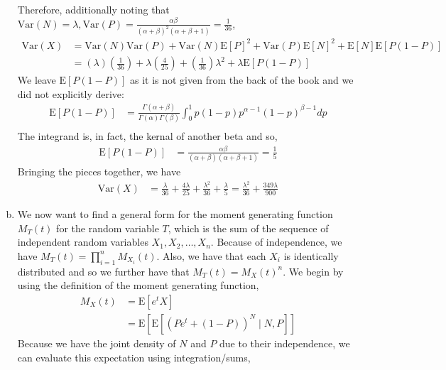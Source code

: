 \documentclass[11pt]{article}
\begin{document}
\begin{enumerate}[(a)]
Therefore, additionally noting that $\mathrm{Var}(N) = \lambda,
\mathrm{Var}(P) = \frac{\alpha
  \beta}{(\alpha+\beta)^2(\alpha+\beta+1)} = \frac{1}{36}$,
\begin{align*}
  \mathrm{Var}(X) &= \mathrm{Var}(N) \mathrm{Var}(P) +
                    \mathrm{Var}(N)\mathrm{E}[P]^2 + \mathrm{Var}(P)
                    \mathrm{E}[N]^2 + \mathrm{E}[N] \mathrm{E}[P(1-P)]
  \\
  &= (\lambda)\left(\frac{1}{36}\right) + \lambda \left( \frac{4}{25}
    \right) + \left( \frac{1}{36} \right) \lambda^2 + \lambda \mathrm{E}[P(1-P)]
\end{align*}
We leave $\mathrm{E}[P(1-P)]$ as it is not given from the back of the
book and we did not explicitly derive:
\begin{align*}
  \mathrm{E}[P(1-P)] &= \frac{\Gamma(\alpha + \beta)}{\Gamma(\alpha)
                       \Gamma(\beta)} \int_0^1 p(1-p)
                       p^{\alpha-1}(1-p)^{\beta-1} dp \\
\end{align*}
The integrand is, in fact, the kernal of another beta and so,
\begin{align*}
  \mathrm{E}[P(1-P)] &= \frac{\alpha \beta}{(\alpha + \beta)(\alpha +
                       \beta + 1)} = \frac{1}{5}
\end{align*}
Bringing the pieces together, we have
\begin{align*}
  \mathrm{Var}(X) &= \frac{\lambda}{36} + \frac{4 \lambda}{25} +
                    \frac{\lambda^2}{36} + \frac{\lambda}{5} =
                    \frac{\lambda^2}{36} + \frac{349\lambda}{900}
\end{align*}
\newpage
\item We now want to find a general form for the moment generating function
$M_T(t)$ for the random variable $T$, which is the sum of the sequence
of independent random variables $X_1, X_2, \dots, X_n$.  Because of
independence, we have $M_T(t) = \prod_{i=1}^n M_{X_i}(t)$.  Also, we
have that each $X_i$ is identically distributed and so we further have
that $M_T(t) = M_X(t)^n$.  We begin by using the definition of the
moment generating function,
\begin{align*}
  M_X(t) &= \mathrm{E}[e^tX] \\
  &= \mathrm{E}[\mathrm{E}[(Pe^t + (1-P))^N \mid N,P]]
\end{align*}
Because we have the joint density of $N$ and $P$ due to their
independence, we can evaluate this expectation using integration/sums,
\begin{align*}

\end{align*}
\end{enumerate}
\end{document}
